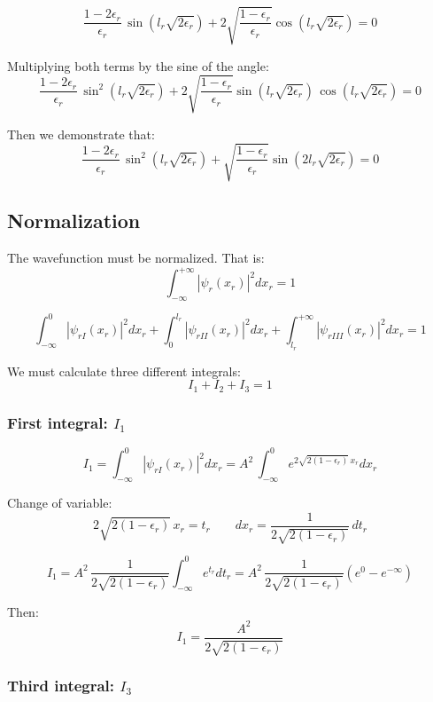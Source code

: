 \[
\frac{1-2\epsilon_r}{\epsilon_r}\,
\sin\left(l_r\sqrt{2\epsilon_r}\right)
+
2\sqrt{\frac{1-\epsilon_r}{\epsilon_r}}
\cos\left(l_r\sqrt{2\epsilon_r}\right)
=0
\]

Multiplying both terms by the sine of the angle:
\[
\frac{1-2\epsilon_r}{\epsilon_r}\,
\sin^2\left(l_r\sqrt{2\epsilon_r}\right)
+
2\sqrt{\frac{1-\epsilon_r}{\epsilon_r}}
\sin\left(l_r\sqrt{2\epsilon_r}\right)\,
\cos\left(l_r\sqrt{2\epsilon_r}\right)
=0
\]

Then we demonstrate that:
\[
\frac{1-2\epsilon_r}{\epsilon_r}\,
\sin^2\left(l_r\sqrt{2\epsilon_r}\right)
+
\sqrt{\frac{1-\epsilon_r}{\epsilon_r}}
\sin\left(2l_r\sqrt{2\epsilon_r}\right)
=0
\]

\subsection{Normalization}
The wavefunction must be normalized. That is:
\[
\int_{-\infty}^{+\infty} \left|\psi_r(x_r)\right|^2 dx_r = 1
\]

\[
\int_{-\infty}^{0}\left|\psi_{rI}(x_r)\right|^2 dx_r 
 + \int_{0}^{l_r}\left|\psi_{rII}(x_r)\right|^2 dx_r 
 + \int_{l_r}^{+\infty}\left|\psi_{rIII}(x_r)\right|^2 dx_r 
 = 1
\]

We must calculate three different integrals:
\begin{equation}
\label{normalization_eq}
I_1 + I_2 + I_3 = 1
\end{equation}

\subsubsection{First integral: $I_1$}

\[
I_1 = \int_{-\infty}^{0}\left|\psi_{rI}(x_r)\right|^2 dx_r 
= 
A^2\,\int_{-\infty}^0 e^{2\sqrt{2(1-\epsilon_r)}\,x_r} dx_r
\]

Change of variable:
\[
2\sqrt{2(1-\epsilon_r)}\,x_r = t_r
\hspace{2em}
dx_r = \frac{1}{2\sqrt{2(1-\epsilon_r)}}\,dt_r
\]

\[
I_1
= A^2\,\frac{1}{2\sqrt{2(1-\epsilon_r)}}\int_{-\infty}^0 e^{t_r} dt_r
= A^2\,\frac{1}{2\sqrt{2(1-\epsilon_r)}}(e^0-e^{-\infty})
\]

Then:
\begin{equation}
\label{I1}
I_1 = \frac{A^2}{2\sqrt{2(1-\epsilon_r)}}
\end{equation}

\subsubsection{Third integral: $I_3$}

